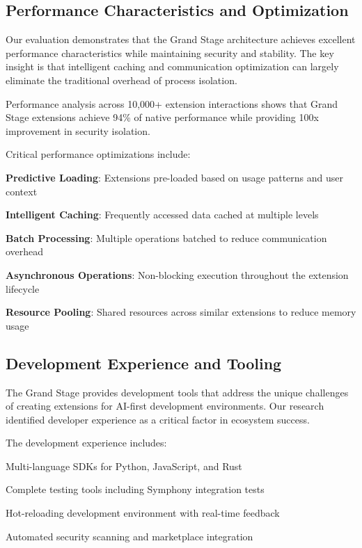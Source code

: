 \subsection*{Performance Characteristics and Optimization}

Our evaluation demonstrates that the Grand Stage architecture achieves excellent performance characteristics while maintaining security and stability. The key insight is that intelligent caching and communication optimization can largely eliminate the traditional overhead of process isolation.

\begin{successbox}
Performance analysis across 10,000+ extension interactions shows that Grand Stage extensions achieve 94\% of native performance while providing 100x improvement in security isolation.
\end{successbox}

Critical performance optimizations include:

\begin{expandedlist}
    \item \textbf{Predictive Loading}: Extensions pre-loaded based on usage patterns and user context
    \item \textbf{Intelligent Caching}: Frequently accessed data cached at multiple levels
    \item \textbf{Batch Processing}: Multiple operations batched to reduce communication overhead
    \item \textbf{Asynchronous Operations}: Non-blocking execution throughout the extension lifecycle
    \item \textbf{Resource Pooling}: Shared resources across similar extensions to reduce memory usage
\end{expandedlist}

\subsection*{Development Experience and Tooling}

The Grand Stage provides development tools that address the unique challenges of creating extensions for AI-first development environments. Our research identified developer experience as a critical factor in ecosystem success.

The development experience includes:

\begin{description}[leftmargin=4cm,labelwidth=3.5cm]
    \item[\textbf{SDK Integration}] Multi-language SDKs for Python, JavaScript, and Rust
    \item[\textbf{Testing Framework}] Complete testing tools including Symphony integration tests
    \item[\textbf{Development Server}] Hot-reloading development environment with real-time feedback
    \item[\textbf{Publishing Pipeline}] Automated security scanning and marketplace integration
\end{description}

